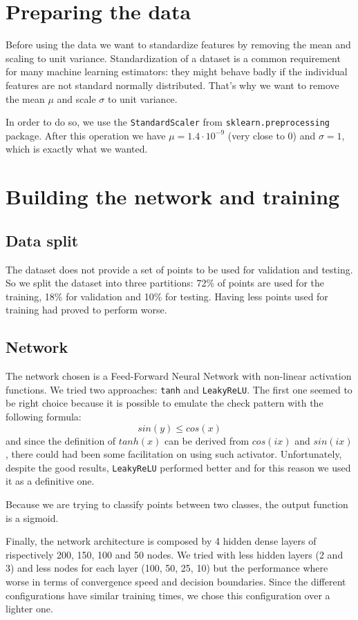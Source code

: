 \documentclass[compsoc]{IEEEtran}
\begin{document}
\section{Preparing the data}
Before using the data we want to standardize features by removing the mean and scaling to unit variance. Standardization of a dataset is a common requirement for many machine learning estimators: they might behave badly if the individual features are not standard normally distributed. That's why we want to remove the mean $\mu$ and scale $\sigma$ to unit variance. \par
In order to do so, we use the \texttt{StandardScaler} from \texttt{sklearn.preprocessing} package. After this operation we have  $\mu=1.4 \cdot 10^{-9}$ (very close to 0) and $\sigma = 1$, which is exactly what we wanted.

\section{Building the network and training}
\subsection{Data split}
The dataset does not provide a set of points to be used for validation and testing. So we split the dataset into three partitions: 72\% of points are used for the training, 18\% for validation and 10\% for testing. Having less points used for training had proved to perform worse.

\subsection{Network}
The network chosen is a Feed-Forward Neural Network with non-linear activation functions. We tried two approaches: \texttt{tanh} and \texttt{LeakyReLU}. The first one seemed to be right choice because it is possible to emulate the check pattern with the following formula:
\[sin(y) \leq cos(x)\]
and since the definition of $tanh(x)$ can be derived from $cos(ix)$ and $sin(ix)$, there could had been some facilitation on using such activator. Unfortunately, despite the good results,
\texttt{LeakyReLU} performed better and for this reason we used it as a definitive one. \par

Because we are trying to classify points between two classes, the output function is a sigmoid. \par

Finally, the network architecture is composed by 4 hidden dense layers of rispectively 200, 150, 100 and 50 nodes. We tried with less hidden layers (2 and 3) and less nodes for each
layer (100, 50, 25, 10) but the performance where worse in terms of convergence speed and decision boundaries. Since the different configurations have similar training times, we chose this configuration over a lighter one.
\end{document}
